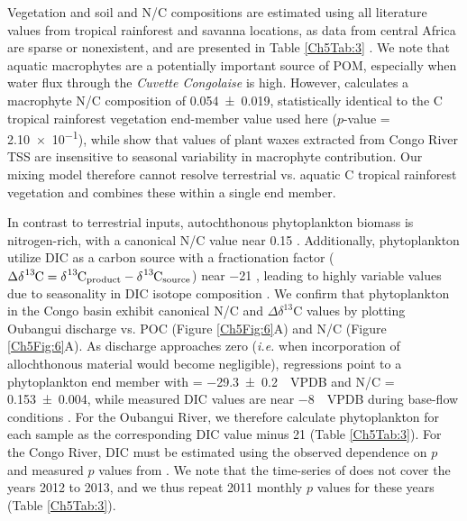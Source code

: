 Vegetation and soil  and N/C compositions are estimated using all literature values from tropical rainforest and savanna locations, as data from central Africa are sparse or nonexistent, and are presented in Table \ref{Ch5Tab:3} \citep{Thomas:1993us,Meyers:1994wca,Powers:2002ug,Powers:2002wg,Ross:2002vp,Cleveland:2007hka,Diefendorf:2010kb,Magill:2013ab}. We note that aquatic macrophytes are a potentially important source of POM, especially when water flux through the \textit{Cuvette Congolaise} is high. However, \citet{Duarte:1992tp} calculates a macrophyte N/C composition of \num{0.054 \pm 0.019}, statistically identical to the C tropical rainforest vegetation end-member value used here ($p$-value = \num{2.10e-1}), while \citet{Hemingway:2016bq} show that  values of plant waxes extracted from Congo River TSS are insensitive to seasonal variability in macrophyte contribution. Our mixing model therefore cannot resolve terrestrial vs. aquatic C tropical rainforest vegetation and combines these within a single end member.

In contrast to terrestrial inputs, autochthonous phytoplankton biomass is nitrogen-rich, with a canonical N/C value near \num{0.15} \citep{Anderson:1994vb}. Additionally, phytoplankton utilize DIC as a carbon source with a fractionation factor ($\ce{\Delta\delta^{13}C} = \ce{\delta^{13}C}_{\text{product}} - \ce{\delta^{13}C}_{\text{source}}$) near \SI{-21}{\permil} \citep{Rau:1989wr}, leading to highly variable  values due to seasonality in DIC isotope composition \citep{Bouillon:2014ko}. We confirm that phytoplankton in the Congo basin exhibit canonical N/C and $\Delta\delta^{13}$C values by plotting Oubangui discharge vs. POC  (Figure \ref{Ch5Fig:6}A) and N/C (Figure \ref{Ch5Fig:6}A). As discharge approaches zero (\textit{i.e.} when incorporation of allochthonous material would become negligible), regressions point to a phytoplankton end member with  = \SI{-29.3 \pm 0.2}{\permil.VPDB} and N/C = \num{0.153 \pm 0.004}, while measured DIC  values are near \SI{-8}{\permil.VPDB} during base-flow conditions \citep{Bouillon:2012cw}. For the Oubangui River, we therefore calculate phytoplankton  for each sample as the corresponding DIC  value minus \SI{21}{\permil} (Table \ref{Ch5Tab:3}). For the Congo River, DIC  must be estimated using the observed dependence on $p$ \citep{Bouillon:2014ko} and measured $p$ values from \citet{Wang:2013js}. We note that the time-series of \citet{Wang:2013js} does not cover the years 2012 to 2013, and we thus repeat 2011 monthly $p$ values for these years (Table \ref{Ch5Tab:3}).

